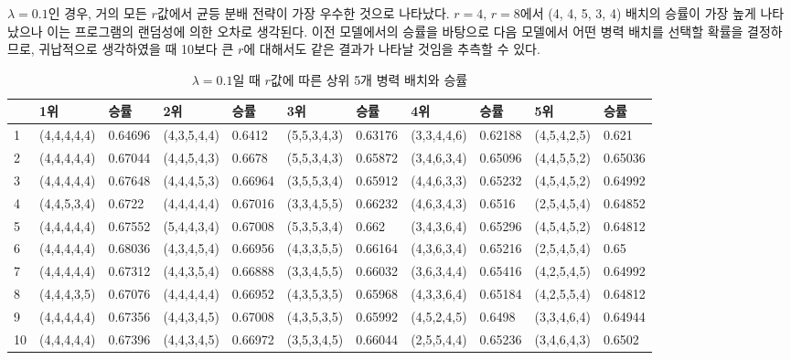 
$\lambda=0.1$인 경우, 거의 모든 $r$값에서 균등 분배 전략이 가장 우수한 것으로 나타났다. $r=4$, $r=8$에서 (4, 4, 5, 3, 4) 배치의 승률이 가장 높게 나타났으나 이는 프로그램의 랜덤성에 의한 오차로 생각된다. 이전 모델에서의 승률을 바탕으로 다음 모델에서 어떤 병력 배치를 선택할 확률을 결정하므로, 귀납적으로 생각하였을 때 10보다 큰 $r$에 대해서도 같은 결과가 나타날 것임을 추측할 수 있다.

\vspace{1em}
\begin{table}[htb]
    \centering
    \caption{$\lambda = 0.1$일 때 $r$값에 따른 상위 5개 병력 배치와 승률}
    {\scriptsize
    \begin{tabular}{l|ll|ll|ll|ll|ll}
     & 1위       & 승률      & 2위       & 승률      & 3위       & 승률      & 4위       & 승률      & 5위       & 승률      \\ \hline
    1               & (4,4,4,4,4) & 0.64696 & (4,3,5,4,4) & 0.6412  & (5,5,3,4,3) & 0.63176 & (3,3,4,4,6) & 0.62188 & (4,5,4,2,5) & 0.621   \\
    2               & (4,4,4,4,4) & 0.67044 & (4,4,5,4,3) & 0.6678  & (5,5,3,4,3) & 0.65872 & (3,4,6,3,4) & 0.65096 & (4,4,5,5,2) & 0.65036 \\
    3               & (4,4,4,4,4) & 0.67648 & (4,4,4,5,3) & 0.66964 & (3,5,5,3,4) & 0.65912 & (4,4,6,3,3) & 0.65232 & (4,5,4,5,2) & 0.64992 \\
    4               & (4,4,5,3,4) & 0.6722  & (4,4,4,4,4) & 0.67016 & (3,3,4,5,5) & 0.66232 & (4,6,3,4,3) & 0.6516  & (2,5,4,5,4) & 0.64852 \\
    5               & (4,4,4,4,4) & 0.67552 & (5,4,4,3,4) & 0.67008 & (5,3,5,3,4) & 0.662   & (3,4,3,6,4) & 0.65296 & (4,5,4,5,2) & 0.64812 \\
    6               & (4,4,4,4,4) & 0.68036 & (4,3,4,5,4) & 0.66956 & (4,3,3,5,5) & 0.66164 & (4,3,6,3,4) & 0.65216 & (2,5,4,5,4) & 0.65    \\
    7               & (4,4,4,4,4) & 0.67312 & (4,4,3,5,4) & 0.66888 & (3,3,4,5,5) & 0.66032 & (3,6,3,4,4) & 0.65416 & (4,2,5,4,5) & 0.64992 \\
    8               & (4,4,4,3,5) & 0.67076 & (4,4,4,4,4) & 0.66952 & (4,3,5,3,5) & 0.65968 & (4,3,3,6,4) & 0.65184 & (4,2,5,5,4) & 0.64812 \\
    9               & (4,4,4,4,4) & 0.67356 & (4,4,3,4,5) & 0.67008 & (4,3,5,3,5) & 0.65992 & (4,5,2,4,5) & 0.6498  & (3,3,4,6,4) & 0.64944 \\
    10              & (4,4,4,4,4) & 0.67396 & (4,4,3,4,5) & 0.66972 & (3,5,3,4,5) & 0.66044 & (2,5,5,4,4) & 0.65236 & (3,4,6,4,3) & 0.6502 
    \end{tabular}
    }
    \label{tab:my_label}
\end{table}

